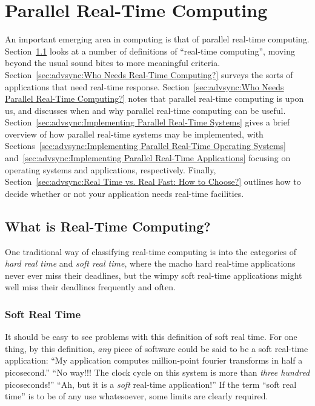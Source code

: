 
\section{Parallel Real-Time Computing}
\label{sec:advsync:Parallel Real-Time Computing}
%

An important emerging area in computing is that of parallel real-time
computing.
Section~\ref{sec:advsync:What is Real-Time Computing?}
looks at a number of definitions of ``real-time computing'', moving
beyond the usual sound bites to more meaningful criteria.
Section~\ref{sec:advsync:Who Needs Real-Time Computing?}
surveys the sorts of applications that need real-time response.
Section~\ref{sec:advsync:Who Needs Parallel Real-Time Computing?}
notes that parallel real-time computing is upon us, and discusses
when and why parallel real-time computing can be useful.
Section~\ref{sec:advsync:Implementing Parallel Real-Time Systems}
gives a brief overview of how parallel real-time systems may be implemented,
with
Sections~\ref{sec:advsync:Implementing Parallel Real-Time Operating Systems}
and~\ref{sec:advsync:Implementing Parallel Real-Time Applications}
focusing on operating systems and applications, respectively.
Finally,
Section~\ref{sec:advsync:Real Time vs. Real Fast: How to Choose?}
outlines how to decide whether or not your application needs real-time
facilities.

\subsection{What is Real-Time Computing?}
\label{sec:advsync:What is Real-Time Computing?}

One traditional way of classifying real-time computing is into the categories
of \emph{hard real time} and \emph{soft real time}, where the macho
hard real-time applications never ever miss their deadlines, but the
wimpy soft real-time applications might well miss their deadlines
frequently and often.

\subsubsection{Soft Real Time}
\label{sec:Soft Real Time}

It should be easy to see problems with this definition of soft real time.
For one thing, by this definition, \emph{any} piece of software could be
said to be a soft real-time application:
``My application computes million-point fourier transforms in half a
picosecond.''
``No way!!!
The clock cycle on this system is more than \emph{three hundred} picoseconds!''
``Ah, but it is a \emph{soft} real-time application!''
If the term ``soft real time'' is to be of any use whatesoever, some limits
are clearly required.

